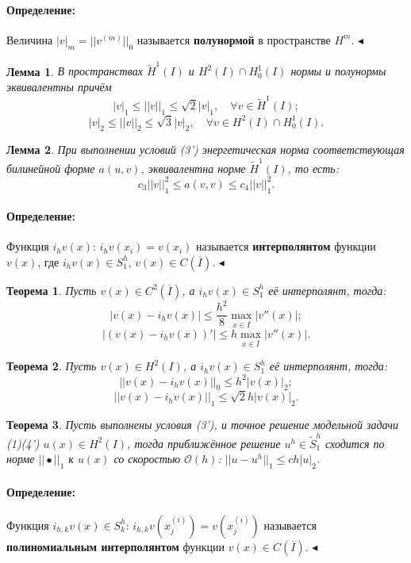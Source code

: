 \documentclass{article}
\newtheorem{theorem}{Теорема}
\newtheorem{lemma}{Лемма}
\newenvironment{definition}{ \paragraph{Определение:}}{\hfill $\blacktriangleleft$}
\begin{document}
\begin{definition}
	Величина $|v|_m = ||v^{(m)}||_0$ называется \textbf{полунормой} в пространстве $H^m$.
\end{definition}

\begin{lemma}
	В пространствах $\tilde{H}^1(I)$ и $H^2(I) \cap H_0^1(I)$ нормы и полунормы эквивалентны причём
	\[
	|v|_1 \leqslant ||v||_1 \leqslant \sqrt{2} |v|_1, \quad \forall v \in \tilde{H}^1(I);	
	\]
	\[
	|v|_2 \leqslant ||v||_2 \leqslant \sqrt{3} |v|_2, \quad \forall v \in H^2(I) \cap H_0^1(I).
	\]
\end{lemma}

\begin{lemma}
	При выполнении условий (3') энергетическая норма соответствующая билинейной форме $a(u,v)$, эквивалентна норме $\tilde{H}^1(I)$, то есть:
	\[
	c_3 ||v||_1^2 \leqslant a(v,v) \leqslant c_4 ||v||_1^2. 	
	\]
\end{lemma}

\begin{definition}
	Функция $i_h v(x)$: $i_h v(x_i)= v(x_i)$ называется \textbf{интерполянтом} функции $v(x)$, где $i_h v(x) \in S_1^h$, $v(x) \in C(\overline{I})$.
\end{definition}

\begin{theorem}
	Пусть $v(x) \in C^2(\overline{I})$, а $i_h v(x) \in S_1^h$ её интерполянт, тогда:
	\[
	|v(x) - i_h v(x)| \leqslant \dfrac{h^2}{8} \max\limits_{x \in \overline{I}} |v''(x)|;	
	\]
	\[
	|(v(x) - i_h v(x))'| \leqslant h \max\limits_{x \in \overline{I}} |v''(x)|.
	\]
\end{theorem}

\begin{theorem}
	Пусть $v(x) \in H^2(I)$, а $i_h v(x) \in S_1^h$ её интерполянт, тогда:
	\[
	||v(x) - i_h v(x)||_0 \leqslant h^2 |v(x)|_2;	
	\]
	\[
	||v(x) - i_h v(x)||_1 \leqslant \sqrt{2}h |v(x)|_2.
	\]
\end{theorem}

\begin{theorem}
	Пусть выполнены условия (3'), и точное решение модельной задачи (1)(4') $u(x) \in H^2(I)$, тогда приближённое решение $u^h \in \tilde{S}_1^h$ сходится по норме $||\bullet||_1$ к $u(x)$ со скоростью $\mathcal{O}(h)$: $||u-u^h||_1 \leqslant c h |u|_2$.
\end{theorem}

\begin{definition}
	Функция $i_{h,k} v(x) \in S_k^h$: $i_{h,k} v(x_j^{(i)})= v(x_j^{(i)})$ называется \textbf{полиномиальным интерполянтом} функции $v(x) \in C(\overline{I})$.
\end{definition}
\end{document}

